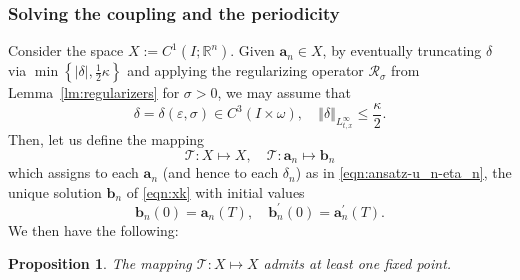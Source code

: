\documentclass[10pt,a4paper]{article}
\newtheorem{proposition}[theorem]{Proposition}
\numberwithin{equation}{section}
\begin{document}
\subsubsection{Solving the coupling and the periodicity}

Consider the space 
$X:=C^{1}\left(I;\mathbb{R}^{n}\right)$. 
Given $\mathbf{a}_n \in X$, by eventually truncating $\delta$ via  $\min\left\{ \left|\delta\right|,\frac{1}{2}\kappa\right\}$ and 
applying the regularizing operator $\mathcal{R}_{\sigma}$ from Lemma~\ref{lm:regularizers} for $\sigma  >0$,
we may assume that 
\[
\delta=\delta(\varepsilon,\sigma)\in C^{3}\left(I\times\omega\right),\quad\left\Vert \delta\right\Vert _{L_{t,x}^{\infty}}\le\frac{\kappa}{2}.
\]
Then,  let us define the mapping 
\begin{equation}
\mathcal{T}:X\mapsto X,\quad\mathcal{T}:\mathbf{a}_{n}\mapsto\mathbf{b}_{n}
\end{equation}
which assigns to each $\mathbf{a}_{n}$ (and hence to each $\delta_n$) as in \eqref{eqn:ansatz-u_n-eta_n}, the unique solution $\mathbf{b}_n$ of \eqref{eqn:xk} with initial values
\[\mathbf{b}_{n}\left(0\right)=\mathbf{a}_{n}\left(T\right),\quad\mathbf{b}_{n}^{\prime}\left(0\right)=\mathbf{a}_{n}^{\prime}\left(T\right).\]
We then have the following:
\begin{proposition}
The mapping $ \mathcal{T}:X \mapsto X$ admits at least one fixed point.
\end{proposition}
\end{document}
